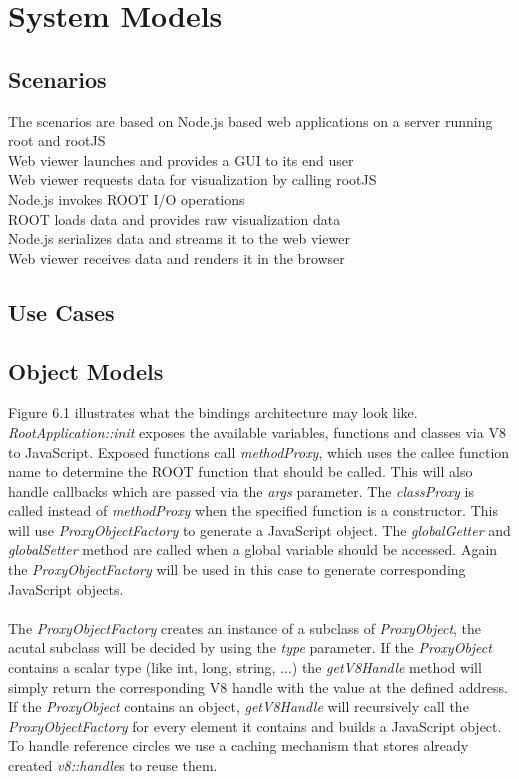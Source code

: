 \chapter{System Models}

\section{Scenarios}
The scenarios are based on Node.js based web applications on a server running root and rootJS\\

Web viewer launches and provides a GUI to its end user	\\
Web viewer requests data for visualization by calling rootJS\\
\indent	Node.js invokes ROOT I/O operations\\
\indent \indent		ROOT loads data and provides raw visualization data\\
\indent	Node.js serializes data and streams it to the web viewer\\
Web viewer receives data and renders it in the browser\\
\section{Use Cases}

\pagebreak[4]

\section{Object Models}
Figure 6.1 illustrates what the bindings architecture may look like.
\textit{RootApplication::init} exposes the available variables, functions and classes via V8 to JavaScript.
Exposed functions call \textit{methodProxy}, which uses the callee function name to determine the ROOT function that should be called. This will also handle callbacks which are passed via the \textit{args} parameter.
The \textit{classProxy} is called instead of \textit{methodProxy} when the specified function is a constructor. This will use \textit{ProxyObjectFactory} to generate a JavaScript object.
The \textit{globalGetter} and \textit{globalSetter} method are called when a global variable should be accessed. Again the \textit{ProxyObjectFactory} will be used in this case to generate corresponding JavaScript objects.
\\\\
The \textit{ProxyObjectFactory} creates an instance of a subclass of \textit{ProxyObject}, the acutal subclass will be decided by using the \textit{type} parameter.
If the \textit{ProxyObject} contains a scalar type (like int, long, string, ...) the \textit{getV8Handle} method will simply return the corresponding V8 handle with the value at the defined address.
If the \textit{ProxyObject} contains an object, \textit{getV8Handle} will recursively call the \textit{ProxyObjectFactory} for every element it contains and builds a JavaScript object.
To handle reference circles we use a caching mechanism that stores already created \textit{v8::handle}s to reuse them.

